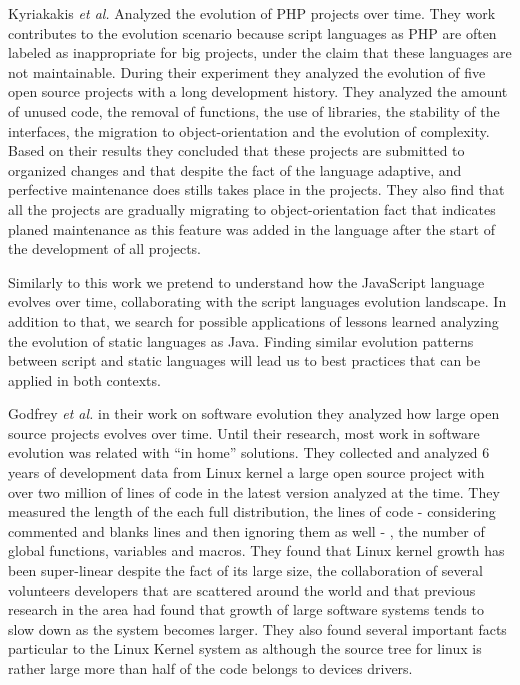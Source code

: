 Kyriakakis \emph{et al.} \cite{Kyriakakis2014ICMSE} Analyzed the evolution of PHP projects over time. They work contributes to the evolution scenario because script languages as PHP are often labeled as inappropriate for big projects, under the claim that these languages are not maintainable. During their experiment they analyzed the evolution of five open source projects with a long development history. They analyzed the amount of unused code, the removal of functions, the use of libraries, the stability of the interfaces, the migration to object-orientation and the evolution of complexity. Based on their results they concluded that these projects are submitted to organized changes and that despite the fact of the language adaptive, and perfective maintenance does stills takes place in the projects. They also find that all the projects are gradually migrating to object-orientation fact that indicates planed maintenance as this feature was added in the language after the start of the development of all projects. 

Similarly to this work we pretend to understand how the JavaScript language evolves over time, collaborating with the script languages evolution landscape. In addition to that, we search for possible applications of lessons learned analyzing the evolution of static languages as Java. Finding similar evolution patterns between script and static languages will lead us to best practices that can be applied in both contexts. 

Godfrey \emph{et al.} \cite{Godfrey2000ICMS} in their work on software evolution they analyzed how large open source projects evolves over time. Until their research, most work in software evolution was related with ``in home'' solutions. They collected and analyzed 6 years of development data from Linux kernel a large open source project with over two million of lines of code in the latest version analyzed at the time. They measured the length of the each full distribution, the lines of code - considering commented and blanks lines and then ignoring them as well - , the number of global functions, variables and macros. They found that Linux kernel growth has been super-linear despite the fact of its large size, the collaboration of several volunteers developers that are scattered around the world and that previous research in the area had found that growth of large software systems tends to slow down as the system becomes larger. They also found several important facts particular to the Linux Kernel system as although the source tree for linux is rather large more than half of the code belongs to devices drivers. 

